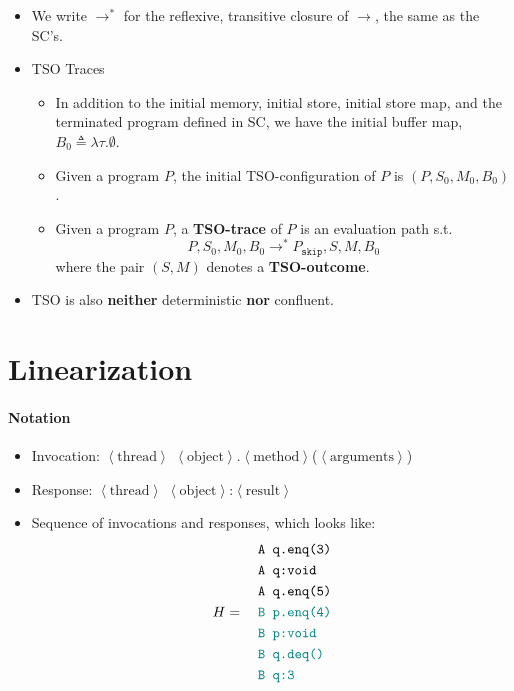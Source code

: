 \documentclass[twocolumn,landscape,10pt]{article}
\theoremstyle{definition}
\begin{document}
\begin{itemize}
    \item We write $\rightarrow^{*}$ for the reflexive, transitive closure of
        $\rightarrow$, the same as the SC's.
    \item TSO Traces
        \begin{itemize}
            \item In addition to the initial memory, initial store, initial
                store map, and the terminated program defined in SC, we have the
                initial buffer map, $B_0\triangleq\lambda\tau.\emptyset$.
            \item Given a program $P$, the initial TSO-configuration of $P$ is
                $(P,S_0,M_0,B_0)$.
            \item Given a program $P$, a \textbf{TSO-trace} of $P$ is an
                evaluation path s.t.
                \[
                    P,S_0,M_0,B_0\rightarrow^* P_\texttt{skip},S,M,B_0
                \]
                where the pair $(S,M)$ denotes a \textbf{TSO-outcome}.
        \end{itemize} 
    \item TSO is also \textbf{neither} deterministic \textbf{nor} confluent.
\end{itemize}

\clearpage
\section{Linearization}

\paragraph{Notation}

\begin{itemize}
    \item{} Invocation:
        $\left\langle\text{thread}\right\rangle$
        $\left\langle\text{object}\right\rangle$.$\left\langle\text{method}\right\rangle$($\left\langle\text{arguments}\right\rangle$)
    \item{} Response:
        $\left\langle\text{thread}\right\rangle$
        $\left\langle\text{object}\right\rangle$:$\left\langle\text{result}\right\rangle$
    \item{} Sequence of invocations and responses,
        which looks like:
        \[
            H = \quad\begin{align}
                &\texttt{A q.enq(3)} \\
                &\texttt{A q:void} \\
                &\texttt{A q.enq(5)} \\
                &\textcolor{teal}{\texttt{B p.enq(4)}} \\
                &\textcolor{teal}{\texttt{B p:void}} \\
                &\textcolor{teal}{\texttt{B q.deq()}} \\
                &\textcolor{teal}{\texttt{B q:3}} \\
            \end{align} 
        \]
\end{itemize} 
\end{document}
